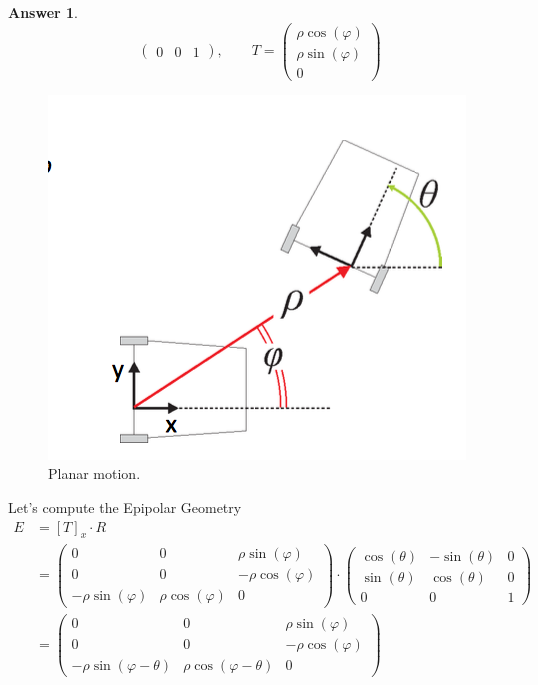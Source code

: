 \documentclass[a4paper,12 pt]{article}
\theoremstyle{definition}
\theoremstyle{remark}
\theoremstyle{definition}
\theoremstyle{definition}
\theoremstyle{definition}
\theoremstyle{definition}
\theoremstyle{remark}
\theoremstyle{remark}
\theoremstyle{definition}
\theoremstyle{definition}
\newtheorem*{answer}{Answer}
\begin{document}
\begin{enumerate}
\begin{answer}
\begin{equation}
\begin{pmatrix}
0&0&1
\end{pmatrix}, \qquad T=\begin{pmatrix}
\rho \cos(\varphi)\\
\rho \sin(\varphi)\\
0
\end{pmatrix}
\end{equation}
\begin{figure}[h!]
\begin{center}
\includegraphics[scale=0.35]{pics/planar_motion}
\caption{Planar motion. \label{fig:planar_motion}}
\end{center}
\end{figure}
Let's compute the Epipolar Geometry
\begin{equation}
\begin{split}
E&=[T]_x\cdot R\\
&=\begin{pmatrix}
0&0&\rho \sin(\varphi)\\
0&0&-\rho \cos(\varphi)\\
-\rho \sin(\varphi)&\rho \cos(\varphi)&0
\end{pmatrix}\cdot \begin{pmatrix}
\cos(\theta)&-\sin(\theta)&0\\
\sin(\theta)&\cos(\theta)&0\\
0&0&1
\end{pmatrix}\\
&=\begin{pmatrix}
0&0&\rho \sin(\varphi)\\
0&0&-\rho \cos(\varphi)\\
-\rho \sin(\varphi-\theta)&\rho\cos(\varphi-\theta)&0

\end{pmatrix}
\end{split}
\end{equation}
\end{answer}
\end{enumerate}
\end{document}
